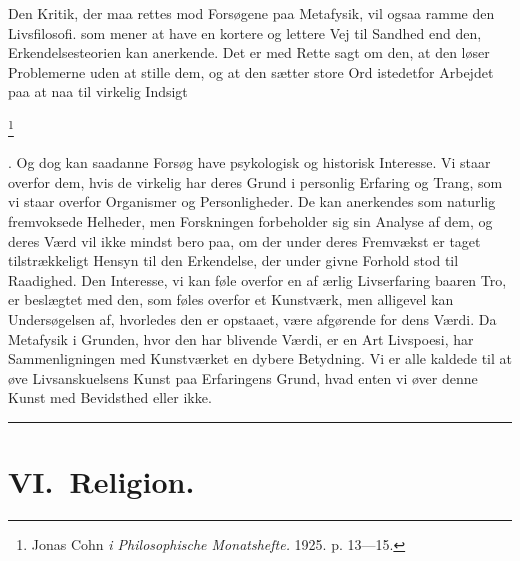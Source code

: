 \documentclass[12pt]{article}
\newcommand{\apage}[1]{\marginnote{\footnotesize\textit{[#1]}}}
\begin{document}
Den Kritik, der maa rettes mod Forsøgene paa Metafysik,
\setcounter{footnote}{0}%
\apage{99}vil ogsaa ramme den \guillemotright{}Livsfilosofi\guillemotleft{}.
som mener at have en kortere og lettere Vej til Sandhed end den,
Erkendelsesteorien kan anerkende. Det er med Rette sagt om den, at den løser
Problemerne uden at stille dem, og at den sætter store Ord istedetfor Arbejdet
paa at naa til virkelig Indsigt

         \footnote{Jonas Cohn \textit{ i Philosophische Monatshefte.} 1925. p.
13---15.}

      . Og dog kan saadanne Forsøg have psykologisk og historisk Interesse. Vi
staar overfor dem, hvis de virkelig har deres Grund i personlig Erfaring og
Trang, som vi staar overfor Organismer og Personligheder. De kan anerkendes som
naturlig fremvoksede Helheder, men Forskningen forbeholder sig sin Analyse af
dem, og deres Værd vil ikke mindst bero paa, om der under deres Fremvækst er
taget tilstrækkeligt Hensyn til den Erkendelse, der under givne Forhold stod
til Raadighed. Den Interesse, vi kan føle overfor en af ærlig Livserfaring
baaren Tro, er beslægtet med den, som føles overfor et Kunstværk, men alligevel
kan Undersøgelsen af, hvorledes den er opstaaet, være afgørende for dens Værdi.
Da Metafysik i Grunden, hvor den har blivende Værdi, er en Art Livspoesi, har
Sammenligningen med Kunstværket en dybere Betydning. Vi er alle kaldede til at
øve Livsanskuelsens Kunst paa Erfaringens Grund, hvad enten vi øver denne Kunst
med Bevidsthed eller ikke.

\begin{center}\rule{3em}{0.4pt}\end{center}
\section*{VI.\ Religion.}
\end{document}
